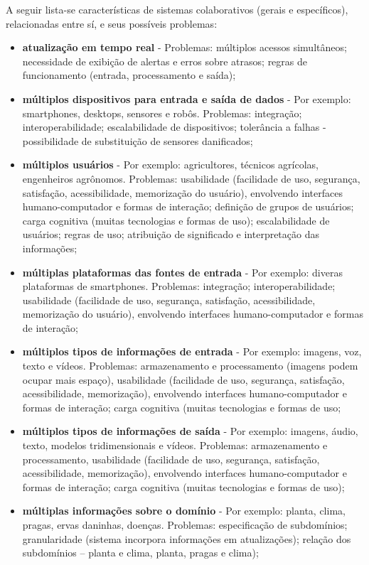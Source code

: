 A seguir lista-se características de sistemas colaborativos (gerais e específicos), relacionadas entre sí, e seus possíveis problemas:

\begin{itemize}
	\item \textbf{atualização em tempo real} - Problemas: múltiplos acessos simultâneos; necessidade de exibição de alertas e erros sobre atrasos; regras de funcionamento (entrada, processamento e saída);
	\item \textbf{múltiplos dispositivos para entrada e saída de dados} - Por exemplo: smartphones, desktops, sensores e robôs. Problemas: integração; interoperabilidade; escalabilidade de dispositivos; tolerância a falhas - possibilidade de substituição de sensores danificados;
	\item \textbf{múltiplos usuários} - Por exemplo: agricultores, técnicos agrícolas, engenheiros agrônomos. Problemas: usabilidade (facilidade de uso, segurança, satisfação, acessibilidade, memorização do usuário), envolvendo interfaces humano-computador e formas de interação; definição de grupos de usuários; carga cognitiva (muitas tecnologias e formas de uso); escalabilidade de usuários; regras de uso; atribuição de significado e interpretação das informações;
	\item \textbf{múltiplas plataformas das fontes de entrada} - Por exemplo: diveras plataformas de smartphones. Problemas: integração; interoperabilidade; usabilidade (facilidade de uso, segurança, satisfação, acessibilidade, memorização do usuário), envolvendo interfaces humano-computador e formas de interação;
	\item \textbf{múltiplos tipos de informações de entrada} - Por exemplo: imagens, voz, texto e vídeos. Problemas: armazenamento e processamento (imagens podem ocupar mais espaço), usabilidade (facilidade de uso, segurança, satisfação, acessibilidade, memorização), envolvendo interfaces humano-computador e formas de interação; carga cognitiva (muitas tecnologias e formas de uso;
	\item \textbf{múltiplos tipos de informações de saída} - Por exemplo: imagens, áudio, texto, modelos tridimensionais e vídeos. Problemas: armazenamento e processamento, usabilidade (facilidade de uso, segurança, satisfação, acessibilidade, memorização), envolvendo interfaces humano-computador e formas de interação; carga cognitiva (muitas tecnologias e formas de uso);
	\item \textbf{múltiplas informações sobre o domínio} - Por exemplo: planta, clima, pragas, ervas daninhas, doenças. Problemas: especificação de subdomínios; granularidade (sistema incorpora informações em atualizações); relação dos subdomínios – planta e clima, planta, pragas e clima);

\end{itemize}
